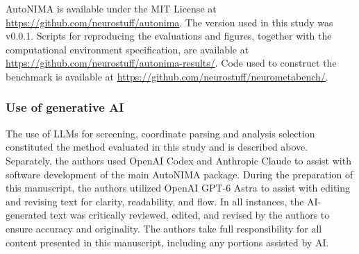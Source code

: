 AutoNIMA is available under the MIT License at \url{https://github.com/neurostuff/autonima}. The version used in this study was v0.0.1. Scripts for reproducing the evaluations and figures, together with the computational environment specification, are available at \url{https://github.com/neurostuff/autonima-results/}. Code used to construct the benchmark is available at \url{https://github.com/neurostuff/neurometabench/}.

\subsubsection{Use of generative AI}

The use of LLMs for screening, coordinate parsing and analysis selection constituted the method evaluated in this study and is described above. Separately, the authors used OpenAI Codex and Anthropic Claude to assist with software development of the main AutoNIMA package. During the preparation of this manuscript, the authors utilized OpenAI GPT-6 Astra to assist with editing and revising text for clarity, readability, and flow. In all instances, the AI-generated text was critically reviewed, edited, and revised by the authors to ensure accuracy and originality. The authors take full responsibility for all content presented in this manuscript, including any portions assisted by AI.

\subsubsection{}

\subsubsection{}
